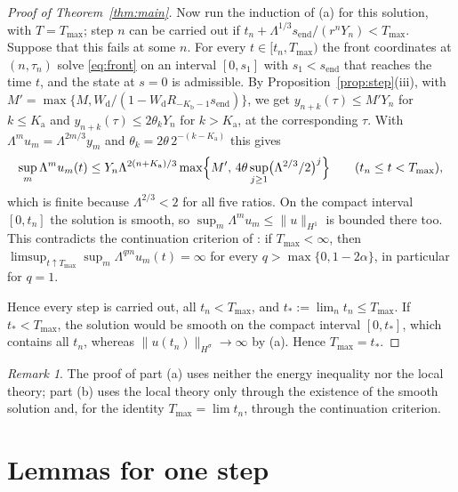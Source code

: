 \documentclass[12pt,reqno]{amsart}
\numberwithin{equation}{section}
\theoremstyle{plain}
\theoremstyle{definition}
\theoremstyle{remark}
\newtheorem{remark}[theorem]{Remark}
\newcommand{\Kb}{K_{\mathrm b}}
\newcommand{\Ka}{K_{\mathrm a}}
\newcommand{\send}{s_{\mathrm{end}}}
\newcommand{\Wd}{W_{\mathrm d}}
\begin{document}
\begin{proof}[Proof of Theorem~\ref{thm:main}]
Now run the induction of (a) for this solution, with $T=T_{\max}$; step $n$
can be carried out if $t_n+\Lambda^{1/3}\send/(r^nY_n)<T_{\max}$. Suppose that this
fails at some $n$. For every $t\in[t_n,T_{\max})$ the front coordinates at
$(n,\tau_n)$ solve \eqref{eq:front} on an interval $[0,s_1]$ with $s_1<\send$
that reaches the time $t$, and the state at $s=0$ is admissible. By
Proposition~\ref{prop:step}(iii), with $M'=\max\{M,\Wd/(1-\Wd R_{-\Kb-1}\send)\}$,
we get $y_{n+k}(\tau)\le M'Y_n$ for $k\le\Ka$ and
$y_{n+k}(\tau)\le2\theta_kY_n$ for $k>\Ka$, at the corresponding $\tau$. With
$\Lambda^mu_m=\Lambda^{2m/3}y_m$ and $\theta_k=2\theta\,2^{-(k-\Ka)}$ this gives
\[
  \sup_m\Lambda^mu_m(t)\le Y_n\Lambda^{2(n+\Ka)/3}\max\Bigl\{M',\,4\theta\sup_{j\ge1}\bigl(\Lambda^{2/3}/2\bigr)^{j}\Bigr\}
  \qquad(t_n\le t<T_{\max}),
\]
which is finite because $\Lambda^{2/3}<2$ for all five ratios. On the compact
interval $[0,t_n]$ the solution is smooth, so $\sup_m\Lambda^mu_m\le\|u\|_{H^1}$ is
bounded there too. This contradicts the continuation criterion of
\cite[Proposition~2.4]{Zha26}: if $T_{\max}<\infty$, then
$\limsup_{t\uparrow T_{\max}}\sup_m\Lambda^{qm}u_m(t)=\infty$ for every
$q>\max\{0,1-2\alpha\}$, in particular for $q=1$.

Hence every step is carried out, all $t_n<T_{\max}$, and $t_*:=\lim_nt_n\le T_{\max}$.
If $t_*<T_{\max}$, the solution would be smooth on the compact interval
$[0,t_*]$, which contains all $t_n$, whereas $\|u(t_n)\|_{H^\sigma}\to\infty$ by (a).
Hence $T_{\max}=t_*$.
\end{proof}

\begin{remark}
The proof of part (a) uses neither the energy inequality nor the local
theory; part (b) uses the local theory only through the existence of
the smooth solution and, for the identity $T_{\max}=\lim t_n$, through the
continuation criterion.
\end{remark}

\section{Lemmas for one step}\label{sec:lemmas}
\end{document}
